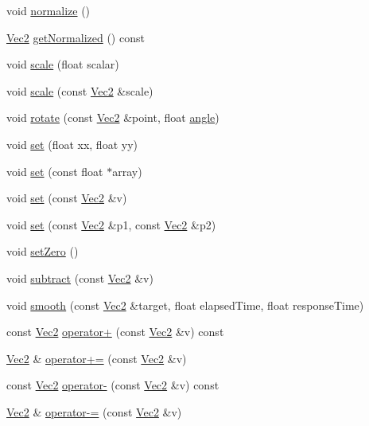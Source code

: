 \begin{DoxyCompactItemize}
void \hyperlink{classVec2_aa0b240c09b19c98d2d2fe462aca478cd}{normalize} ()
\item 
\hyperlink{classVec2}{Vec2} \hyperlink{classVec2_a1bcbcc58d94b67c58718f2415afad1be}{get\+Normalized} () const
\item 
void \hyperlink{classVec2_a67d98d1e2261ae9369bd79c337187cd8}{scale} (float scalar)
\item 
void \hyperlink{classVec2_ae2c74b30190869c962302065cfeecf8c}{scale} (const \hyperlink{classVec2}{Vec2} \&scale)
\item 
void \hyperlink{classVec2_acb4191c1852c73801734d10386722ccf}{rotate} (const \hyperlink{classVec2}{Vec2} \&point, float \hyperlink{classVec2_a8e791a6d3b657e714587295b6fc331b6}{angle})
\item 
void \hyperlink{classVec2_a74b21ca56da0a8db13168c627929ffd0}{set} (float xx, float yy)
\item 
void \hyperlink{classVec2_a492bf35fe6975aebe475519f21d86364}{set} (const float $\ast$array)
\item 
void \hyperlink{classVec2_a2c4e29e470c177b19c8f2ccaee8d6185}{set} (const \hyperlink{classVec2}{Vec2} \&v)
\item 
void \hyperlink{classVec2_a4e76b9c6df8c81a4035107961d670caf}{set} (const \hyperlink{classVec2}{Vec2} \&p1, const \hyperlink{classVec2}{Vec2} \&p2)
\item 
void \hyperlink{classVec2_aa39a7344e5af312b4aa88fdf21aa5369}{set\+Zero} ()
\item 
void \hyperlink{classVec2_a16a3531b2ccb1517fde0f43bfaf7364c}{subtract} (const \hyperlink{classVec2}{Vec2} \&v)
\item 
void \hyperlink{classVec2_a6e37c8d6604b45cc5206ea64ac2d4c77}{smooth} (const \hyperlink{classVec2}{Vec2} \&target, float elapsed\+Time, float response\+Time)
\item 
const \hyperlink{classVec2}{Vec2} \hyperlink{classVec2_ad2383d77974a8092b149391c2edce7fd}{operator+} (const \hyperlink{classVec2}{Vec2} \&v) const
\item 
\hyperlink{classVec2}{Vec2} \& \hyperlink{classVec2_ae19f0fad92bf57a440b0367a1a71acd2}{operator+=} (const \hyperlink{classVec2}{Vec2} \&v)
\item 
const \hyperlink{classVec2}{Vec2} \hyperlink{classVec2_afea5a75f39e0db3d893aa56f11e90a60}{operator-\/} (const \hyperlink{classVec2}{Vec2} \&v) const
\item 
\hyperlink{classVec2}{Vec2} \& \hyperlink{classVec2_a8be0266d41d4ee2f550a4e36e6f4b364}{operator-\/=} (const \hyperlink{classVec2}{Vec2} \&v)

\end{DoxyCompactItemize}
